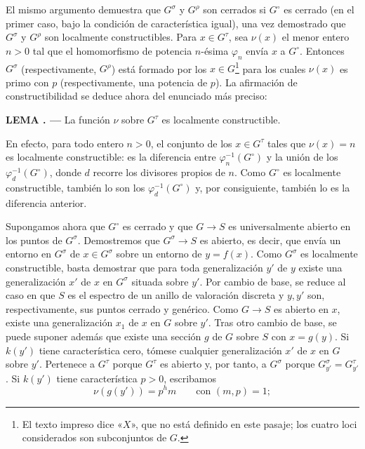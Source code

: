 \documentclass[11pt,twoside,openany]{book}
\numberwithin{equation}{section}
\theoremstyle{plain}
\theoremstyle{definition}
\theoremstyle{remark}
\newcommand{\result}[2]{%
  \par\medskip\noindent\textbf{#1%
  \if\relax\detokenize{#2}\relax\else\space#2\fi. ---}\enspace
}
\theoremstyle{plain}
\theoremstyle{definition}
\theoremstyle{remark}
\begin{document}
El mismo argumento demuestra que $G^\sigma$ y $G^\rho$ son cerrados si
$G^\circ$ es cerrado (en el primer caso, bajo la condición de característica
igual), una vez demostrado que $G^\sigma$ y $G^\rho$ son localmente
constructibles. Para $x\in G^\tau$, sea $\nu(x)$ el menor entero $n>0$ tal que
el homomorfismo de potencia $n$-ésima $\varphi_n$ envía $x$ a $G^\circ$.
Entonces $G^\sigma$ (respectivamente, $G^\rho$) está formado por los
$x\in G$\footnote{El texto impreso dice «$X$», que no está definido en este
pasaje; los cuatro loci considerados son subconjuntos de $G$.} para los cuales
$\nu(x)$ es primo con $p$ (respectivamente, una potencia de $p$). La afirmación
de constructibilidad se deduce ahora del enunciado más preciso:

\result{LEMA}{1.4} La función $\nu$ sobre $G^\tau$ es localmente
constructible.

En efecto, para todo entero $n>0$, el conjunto de los $x\in G^\tau$ tales que
$\nu(x)=n$ es localmente constructible: es la diferencia entre
$\varphi_n^{-1}(G^\circ)$ y la unión de los
$\varphi_d^{-1}(G^\circ)$, donde $d$ recorre los divisores propios de $n$.
Como $G^\circ$ es localmente constructible, también lo son los
$\varphi_d^{-1}(G^\circ)$ y, por consiguiente, también lo es la diferencia
anterior.

Supongamos ahora que $G^\circ$ es cerrado y que $G\longrightarrow S$ es
universalmente abierto en los puntos de $G^\sigma$. Demostremos que
$G^\sigma\longrightarrow S$ es abierto, es decir, que envía un entorno en
$G^\sigma$ de $x\in G^\sigma$ sobre un entorno de $y=f(x)$. Como $G^\sigma$ es
localmente constructible, basta demostrar que para toda generalización $y'$ de
$y$ existe una generalización $x'$ de $x$ en $G^\sigma$ situada sobre $y'$.
Por cambio de base, se reduce al caso en que $S$ es el espectro de un anillo de
valoración discreta y $y,y'$ son, respectivamente, sus puntos cerrado y
genérico. Como $G\longrightarrow S$ es abierto en $x$, existe una
generalización $x_1$ de $x$ en $G$ sobre $y'$. Tras otro cambio de base, se
puede suponer además que existe una sección $g$ de $G$ sobre $S$ con
$x=g(y)$. Si $k(y')$ tiene característica cero, tómese cualquier
generalización $x'$ de $x$ en $G$ sobre $y'$. Pertenece a $G^\tau$ porque
$G^\tau$ es abierto y, por tanto, a $G^\sigma$ porque
$G_{y'}^\sigma=G_{y'}^\tau$. Si $k(y')$ tiene característica $p>0$, escribamos
\[
\nu(g(y'))=p^hm\qquad\text{con }(m,p)=1;
\]
\end{document}

